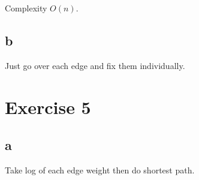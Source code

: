 \documentclass[a4paper,10pt,twoside]{article}
\begin{document}
Complexity $O(n)$.

\subsection*{b}
Just go over each edge and fix them individually.


\section*{Exercise 5}
\subsection*{a}

Take log of each edge weight then do shortest path.
\end{document}

